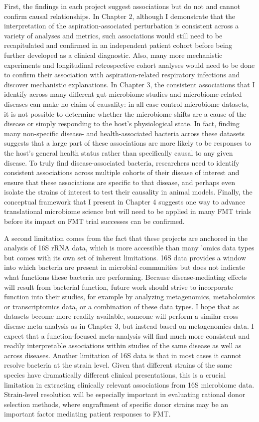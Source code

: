First, the findings in each project suggest associations but do not and cannot confirm causal relationships.
In Chapter 2, although I demonstrate that the interpretation of the aspiration-associated perturbation is consistent across a variety of analyses and metrics, such associations would still need to be recapitulated and confirmed in an independent patient cohort before being further developed as a clinical diagnostic.
Also, many more mechanistic experiments and longitudinal retrospective cohort analyses would need to be done to confirm their association with aspiration-related respiratory infections and discover mechanistic explanations.
In Chapter 3, the consistent associations that I identify across many different gut microbiome studies and microbiome-related diseases can make no claim of causality: in all case-control microbiome datasets, it is not possible to determine whether the microbiome shifts are a cause of the disease or simply responding to the host's physiological state.
In fact, finding many non-specific disease- and health-associated bacteria across these datasets suggests that a large part of these associations are more likely to be responses to the host's general health status rather than specifically causal to any given disease.
To truly find disease-associated bacteria, researchers need to identify consistent associations across multiple cohorts of their disease of interest and ensure that these associations are specific to that disease, and perhaps even isolate the strains of interest to test their causality in animal models.
Finally, the conceptual framework that I present in Chapter 4 suggests one way to advance translational microbiome science but will need to be applied in many FMT trials before its impact on FMT trial successes can be confirmed.

A second limitation comes from the fact that these projects are anchored in the analysis of 16S rRNA data, which is more accessible than many 'omics data types but comes with its own set of inherent limitations.
16S data provides a window into which bacteria are present in microbial communities but does not indicate what functions these bacteria are performing.
Because disease-mediating effects will result from bacterial function, future work should strive to incorporate function into their studies, for example by analyzing metagenomics, metabolomics or transcriptomics data, or a combination of these data types.
I hope that as datasets become more readily available,  someone will perform a similar cross-disease meta-analysis as in Chapter 3, but instead based on metagenomics data.
I expect that a function-focused meta-analysis will find much more consistent and readily interpretable associations within studies of the same disease as well as across diseases.
Another limitation of 16S data is that in most cases it cannot resolve bacteria at the strain level.
Given that different strains of the same species have dramatically different clinical presentations, this is a crucial limitation in extracting clinically relevant associations from 16S microbiome data.
Strain-level resolution will be especially important in evaluating rational donor selection methods, where engraftment of specific donor strains may be an important factor mediating patient responses to FMT.

